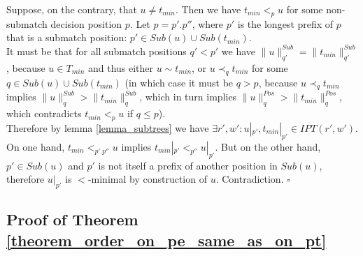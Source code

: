 \documentclass[AMA,STIX1COL]{WileyNJD-v2}
\newcommand{\IPT}{I\!PT}
\newcommand{\pnorm}[2]{\|{#1}\|^{Pos}_{#2}}
\newcommand{\snorm}[2]{\|{#1}\|^{Sub}_{#2}}
\begin{document}
    Suppose, on the contrary, that $u \neq t_{min}$.
    Then we have $t_{min} <_p u$ for some non-submatch decision position $p$.
    Let $p = p'.p''$, where $p'$ is the longest prefix of $p$ that is a submatch position: $p' \in Sub(u) \cup Sub(t_{min})$.
    \\[-1em]

    It must be that for all submatch positions $q' < p'$ we have $\snorm{u}{q'} = \snorm{t_{min}}{q'}$,
    because $u \in T_{min}$ and thus either $u \sim t_{min}$,
    or $u \prec_q t_{min}$ for some $q \in Sub(u) \cup Sub(t_{min})$
    (in which case it must be $q > p$, because $u \prec_q t_{min}$ implies $\snorm{u}{q} > \snorm{t_{min}}{q}$,
    which in turn implies $\pnorm{u}{q} > \pnorm{t_{min}}{q}$,
    which contradicts $t_{min} <_p u$ if $q \leq p$).
    \\[-1em]

    Therefore by lemma \ref{lemma_subtrees} we have $\exists r', w' : u|_{p'}, t_{min}|_{p'} \in \IPT(r', w')$.
    On one hand, $t_{min} <_{p'.p''} u$ implies $t_{min}|_{p'} <_{p''} u|_{p'}$.
    But on the other hand, $p' \in Sub(u)$ and $p'$ is not itself a prefix of another position in $Sub(u)$,
    therefore $u|_{p'}$ is $<$-minimal by construction of $u$.
    Contradiction.
%    
    $\square$


\subsection*{Proof of Theorem \ref{theorem_order_on_pe_same_as_on_pt}}
\end{document}

